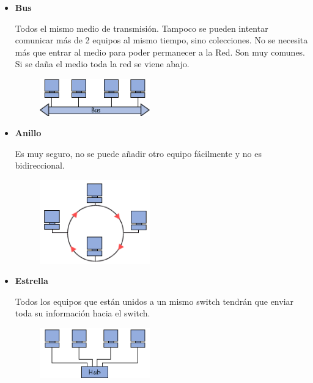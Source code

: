 \documentclass[12pt, fleqn]{report}                             %
\theoremstyle{break}                                            %
\begin{document}
            \begin{itemize}
                
                \item \textbf{Bus}

                    Todos el mismo medio de transmisión.
                    Tampoco se pueden intentar comunicar más de 2 equipos al mismo tiempo, sino colecciones.
                    No se necesita más que entrar al medio para poder permanecer a la Red.
                    Son muy comunes. Si se daña el medio toda la red se viene abajo.

                    \begin{figure}[h]
                        \centering
                        \includegraphics[width=0.45\textwidth]{Bus}
                    \end{figure}

                \item \textbf{Anillo}

                    Es muy seguro, no se puede añadir otro equipo fácilmente y no es bidireccional.

                    \begin{figure}[h]
                        \centering
                        \includegraphics[width=0.45\textwidth]{Anillo}
                    \end{figure}

                \item \textbf{Estrella}

                    Todos los equipos que están unidos a un mismo switch tendrán que enviar toda su información
                    hacia el switch. 

                    \begin{figure}[h]
                        \centering
                        \includegraphics[width=0.45\textwidth]{Estrella}
                    \end{figure}


\end{itemize}
\end{document}
